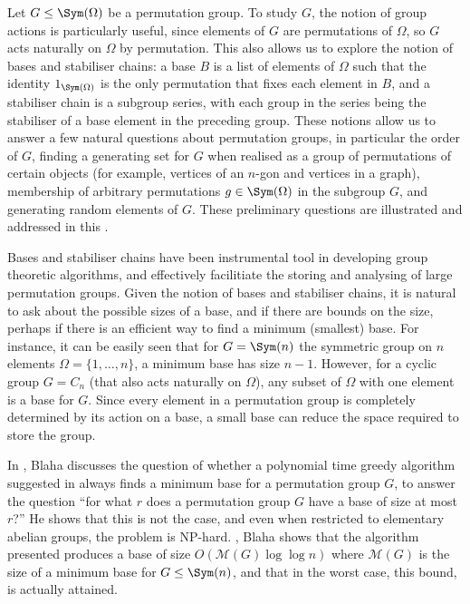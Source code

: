 {    Let $G \leq \Sym(\Omega)$ be a permutation group. To study $G$, the notion of group actions is particularly useful, since elements of $G$ are permutations of $\Omega$, so $G$ acts naturally on $\Omega$ by permutation. This also allows us to explore the notion of bases and stabiliser chains: a base $B$ is a list of elements of $\Omega$ such that the identity $1_{\Sym(\Omega)}$ is the only permutation that fixes each element in $B$, and a stabiliser chain  is a subgroup series, with each group in the series being the stabiliser of a base element in the preceding group.  These notions allow us to answer a few natural questions about permutation groups, in particular  the order of $G$, finding a generating set for $G$ when realised as a group of permutations of certain objects (for example, vertices of an $n$-gon and vertices in a graph),  membership of arbitrary permutations $g \in \Sym(\Omega)$ in the subgroup $G$, and generating random elements of $G$. These preliminary questions are illustrated and addressed in this \thesis{}.

    Bases and stabiliser chains have been  instrumental tool in developing group theoretic algorithms, and effectively facilitiate the storing and analysing of large permutation groups. Given the notion of bases and stabiliser chains, it is natural to ask about the possible sizes of a base, and if there are bounds on the size, perhaps if there is an efficient way to find a minimum (smallest) base. For instance, it can be easily seen that for $G = \Sym(n)$ the symmetric group on $n$ elements $\Omega = \{1,\dotsc,n\}$, a minimum base has size $n-1$. However, for a cyclic group $G = C_n$ (that also acts naturally on $\Omega$), any subset of $\Omega$ with one element is a base for $G$. Since every element in a permutation group is completely determined by its action on a base, a small base can reduce the space required to store the group.

    In \cite{blaha1992}, Blaha discusses the question of whether a polynomial time greedy algorithm suggested in \cite{brown1989} always finds a minimum base for a permutation group $G$, to answer the question ``for what $r$ does a permutation group $G$ have a base of size at most $r$?'' He shows that this is not the case, and even when restricted to elementary abelian groups, the problem is NP-hard. , Blaha shows that the algorithm presented produces a base of size $O(\mathcal{M}(G)\log\log n)$ where $\mathcal{M}(G)$ is the size of a minimum base for $G \leq \Sym(n)$, and that in the worst case, this bound,  is actually attained.

}
